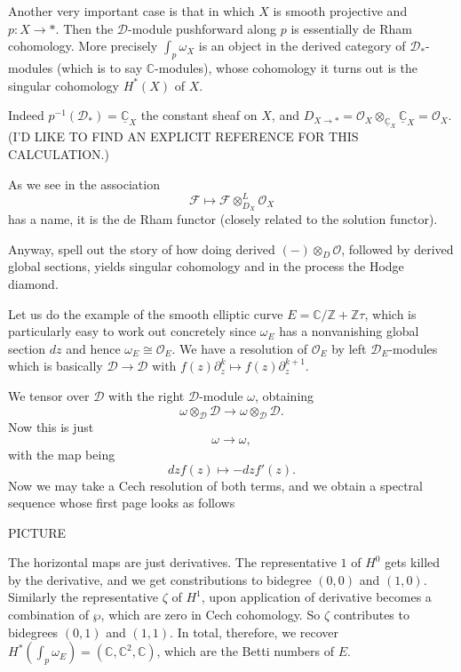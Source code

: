 \documentclass[12pt]{article}
\theoremstyle{plain}
\theoremstyle{definition}
\numberwithin{equation}{section}
\newcommand{\C}{\mathbb{C}}
\newcommand{\Z}{\mathbb{Z}}
\newcommand{\CD}{\mathcal{D}}
\newcommand{\CF}{\mathcal{F}}
\newcommand{\OO}{\mathcal{O}}
\begin{document}
{\color{blue}Another very important case is that in which $X$ is smooth projective and $p : X \rightarrow *$. Then the $\CD$-module pushforward along $p$ is essentially de Rham cohomology. More precisely $\int_p \omega_X$ is an object in the derived category of $\CD_*$-modules (which is to say $\C$-modules), whose cohomology it turns out is the singular cohomology $H^*(X)$ of $X$.

Indeed $p^{-1}(\CD_*) = \underline{\C}_X$ the constant sheaf on $X$, and $D_{X \rightarrow *} = \OO_X \otimes_{\underline{\C}_X} \underline{\C}_X = \OO_X$. (I'D LIKE TO FIND AN EXPLICIT REFERENCE FOR THIS CALCULATION.)

As we see in {\cite[?????]{HTT}} the association
\[
\CF \mapsto \CF \otimes^L_{D_X} \OO_{X}
\]
has a name, it is the de Rham functor (closely related to the solution functor).

Anyway, spell out the story of how doing derived $(-) \otimes_{D} \OO$, followed by derived global sections, yields singular cohomology and in the process the Hodge diamond.


Let us do the example of the smooth elliptic curve $E = \C / \Z + \Z \tau$, which is particularly easy to work out concretely since $\omega_E$ has a nonvanishing global section $dz$ and hence $\omega_E \cong \OO_E$. We have a resolution of $\OO_E$ by left $\CD_E$-modules which is basically $\CD \rightarrow \CD$ with $f(z) \partial_z^k \mapsto f(z) \partial_z^{k+1}$.

We tensor over $\CD$ with the right $\CD$-module $\omega$, obtaining
\[
\omega \otimes_{\CD} \CD \rightarrow \omega \otimes_{\CD} \CD.
\]
Now this is just
\[
\omega \rightarrow \omega,
\]
with the map being
\[
dz f(z) \mapsto -dz f'(z).
\]
Now we may take a Cech resolution of both terms, and we obtain a spectral sequence whose first page looks as follows

PICTURE

The horizontal maps are just derivatives. The representative $1$ of $H^0$ gets killed by the derivative, and we get constributions to bidegree $(0, 0)$ and $(1, 0)$. Similarly the representative $\zeta$ of $H^1$, upon application of derivative becomes a combination of $\wp$, which are zero in Cech cohomology. So $\zeta$ contributes to bidegrees $(0, 1)$ and $(1, 1)$. In total, therefore, we recover $H^*(\int_p \omega_E) = (\C, \C^2, \C)$, which are the Betti numbers of $E$.



}
\end{document}
